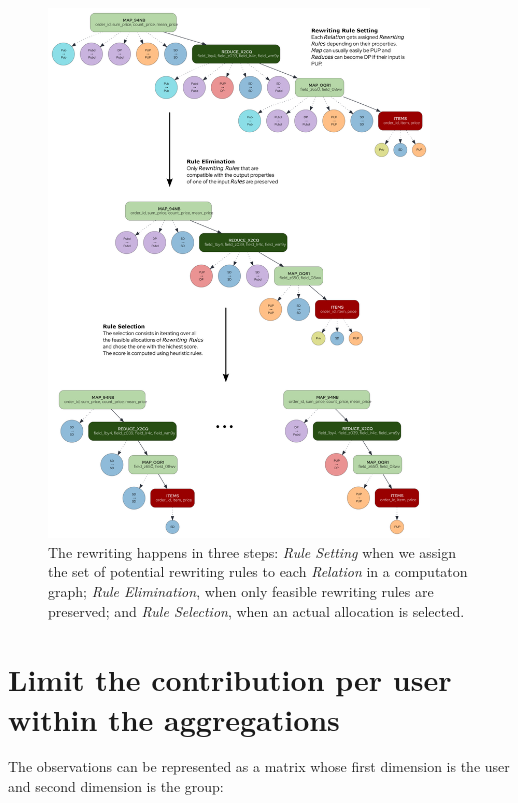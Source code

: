 \documentclass[letterpaper]{article} %
\begin{document}
\begin{figure}[t]
    \centering
    \includegraphics[width=0.9\textwidth]{figures/set_eliminate_select} %
    \caption{The rewriting happens in three steps: \emph{Rule Setting} when we assign the set of potential rewriting rules to each \emph{Relation} in a computaton graph; \emph{Rule Elimination}, when only feasible rewriting rules are preserved; and \emph{Rule Selection}, when an actual allocation is selected.}
    \label{fig:set_eliminate_select}
\end{figure}


\section*{Limit the contribution per user within the aggregations}
\label{sec:limit_contrib_per_user}

The observations can be represented as a matrix whose first dimension is the user
and second dimension is the group:
\end{document}
